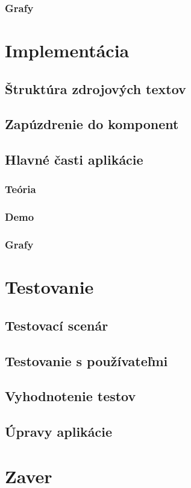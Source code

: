 \subsection{Grafy}

\chapter{Implementácia}
\label{implementacia}
\section{Štruktúra zdrojových textov}
\section{Zapúzdrenie do komponent}
\section{Hlavné časti aplikácie }
\subsection{Teória}
\subsection{Demo}
\subsection{Grafy}

\chapter{Testovanie}
\label{testovanie}
\section{Testovací scenár}
\section{Testovanie s používateľmi}
\section{Vyhodnotenie testov}
\section{Úpravy aplikácie}

\chapter{Zaver}
\label{zaver}